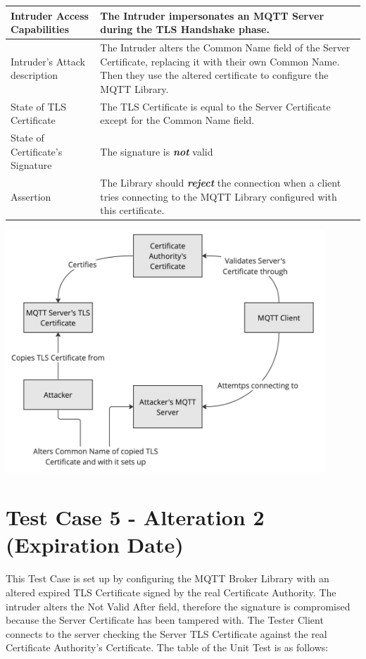 \documentclass[binding=0.6cm,noexaminfo]{sapthesis}
\begin{document}
\begin{center}
\begin{tabular}{| p{6cm} | p{6cm} |}
\hline
Intruder Access Capabilities & The Intruder impersonates an MQTT Server during the TLS Handshake phase. \\
\hline
Intruder’s Attack description & The Intruder alters the Common Name field of the Server Certificate, replacing it with their own Common Name. Then they use the altered certificate to configure the MQTT Library. \\
\hline
State of TLS Certificate & The TLS Certificate is equal to the Server Certificate except for the Common Name field. \\
\hline
State of Certificate’s Signature & The signature is \textbf{\textit{not}} valid \\
\hline
Assertion & The Library should \textbf{\textit{reject}} the connection when a client tries connecting to the MQTT Library configured with this certificate. \\
\hline
\end{tabular}
\end{center}

\includegraphics[width=12cm]{TC4}

\newpage
\section{Test Case 5 - Alteration 2 (Expiration Date)}
This Test Case is set up by configuring the MQTT Broker Library with an altered expired TLS Certificate signed by the real Certificate Authority. The intruder alters the Not Valid After field, therefore the signature is compromised because the Server Certificate has been tampered with. The Tester Client connects to the server checking the Server TLS Certificate against the real Certificate Authority’s Certificate. The table of the Unit Test is as follows:
\end{document}
